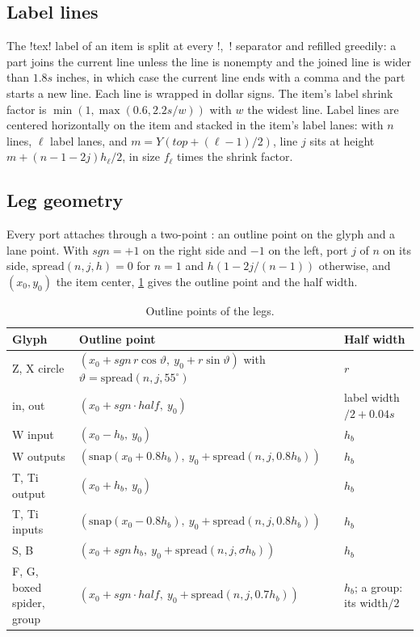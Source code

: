 {\subsection{Label lines}\label{sec:pictorial-figure-labels}

The \code!tex! label of an item is split at every \code!,\ ! separator and refilled greedily:
a part joins the current line unless the line is nonempty and the joined line is wider than
$1.8s$ inches, in which case the current line ends with a comma and the part starts a new line.
Each line is wrapped in dollar signs. The item's label shrink factor is
$\min(1, \max(0.6, 2.2s/w))$ with $w$ the widest line. Label lines are centered horizontally on
the item and stacked in the item's label lanes: with $n$ lines, $\ell$ label lanes, and
$m = Y(\mathit{top} + (\ell-1)/2)$, line $j$ sits at height $m + (n-1-2j)h_\ell/2$, in size
$f_\ell$ times the shrink factor.

\subsection{Leg geometry}\label{sec:pictorial-legs}

Every port attaches through a two-point : an outline point on the glyph and a lane
point. With $\mathit{sgn} = +1$ on the right side and $-1$ on the left, port $j$ of $n$ on its
side, $\mathrm{spread}(n, j, h) = 0$ for $n=1$ and $h(1 - 2j/(n-1))$ otherwise, and $(x_0,y_0)$
the item center, \cref{tab:pictorial-legs} gives the outline point and the half width.

\begin{longtable}{@{}p{}p{}p{}@{}}
\caption{Outline points of the legs.}\label{tab:pictorial-legs}\\
\toprule
Glyph & Outline point & Half width \\
\midrule
\endfirsthead
Z, X circle & $(x_0+\mathit{sgn}\,r\cos\vartheta,\ y_0+r\sin\vartheta)$ with
  $\vartheta = \mathrm{spread}(n,j,55^\circ)$ & $r$ \\
in, out & $(x_0+\mathit{sgn}\cdot\mathit{half},\ y_0)$ & label width$/2 + 0.04s$ \\
W input & $(x_0-h_b,\ y_0)$ & $h_b$ \\
W outputs & $(\mathrm{snap}(x_0+0.8h_b),\ y_0+\mathrm{spread}(n,j,0.8h_b))$ & $h_b$ \\
T, Ti output & $(x_0+h_b,\ y_0)$ & $h_b$ \\
T, Ti inputs & $(\mathrm{snap}(x_0-0.8h_b),\ y_0+\mathrm{spread}(n,j,0.8h_b))$ & $h_b$ \\
S, B & $(x_0+\mathit{sgn}\,h_b,\ y_0+\mathrm{spread}(n,j,\sigma h_b))$ & $h_b$ \\
F, G, boxed spider, group & $(x_0+\mathit{sgn}\cdot\mathit{half},\
  y_0+\mathrm{spread}(n,j,0.7h_b))$ & $h_b$; a group: its width$/2$ \\
\bottomrule
\end{longtable}

}
